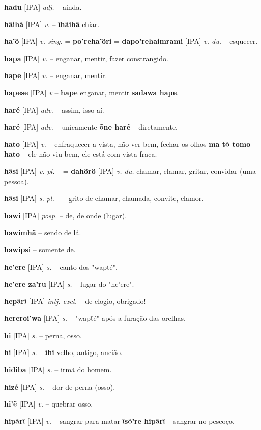 \textbf{hadu} [IPA] \textit{adj.} -- ainda.

\textbf{hãihã} [IPA] \textit{v.} -- \textbf{ĩhãihã} chiar.

\textbf{ha'ö} [IPA] \textit{v. sing.} = \textbf{po'reha'öri} = \textbf{dapo'rehaimrami} [IPA] \textit{v. du.} -- esquecer.

\textbf{hapa} [IPA] \textit{v.} -- enganar, mentir, fazer constrangido.

\textbf{hape} [IPA] \textit{v.} -- enganar, mentir.

\textbf{hapese} [IPA] \textit{v} -- \textbf{hape} enganar, mentir  \textbf{sadawa hape}.

\textbf{haré} [IPA] \textit{adv.} -- assim, isso aí.

\textbf{haré} [IPA] \textit{adv.} -- unicamente  \textbf{õne haré} -- diretamente.

\textbf{hato} [IPA] \textit{v.} -- enfraquecer a vista, não ver bem, fechar os olhos  \textbf{ma tõ tomo hato} -- ele não viu bem, ele está com vista fraca.

\textbf{hãsi} [IPA] \textit{v. pl.} -- = \textbf{dahörö} [IPA] \textit{v. du.} chamar, clamar, gritar, convidar (uma pessoa).

\textbf{hãsi} [IPA] \textit{s. pl.} -- -- grito de chamar, chamada, convite, clamor.

\textbf{hawi} [IPA] \textit{posp.} -- de, de onde (lugar).

\textbf{hawimhã} -- sendo de lá.

\textbf{hawipsi} -- somente de.

\textbf{he'ere} [IPA] \textit{s.} -- canto dos "wapté".

\textbf{he'ere za'ru} [IPA] \textit{s.} -- lugar do "he'ere".

\textbf{hepãrĩ} [IPA] \textit{intj. excl.} -- de elogio, obrigado!

\textbf{hereroi'wa} [IPA] \textit{s.} -- "wapt̃é" após a furação das orelhas.

\textbf{hi} [IPA] \textit{s.} -- perna, osso.

\textbf{hi} [IPA] \textit{s.} -- \textbf{ĩhi} velho, antigo, ancião.

\textbf{hidiba} [IPA] \textit{s.} -- irmã do homem.

\textbf{hizé} [IPA] \textit{s.} -- dor de perna (osso).

\textbf{hi'ẽ} [IPA] \textit{v.} -- quebrar osso.

\textbf{hipãrĩ} [IPA] \textit{v.} -- sangrar para matar  \textbf{ĩsõ're hipãrĩ} -- sangrar no pescoço.

